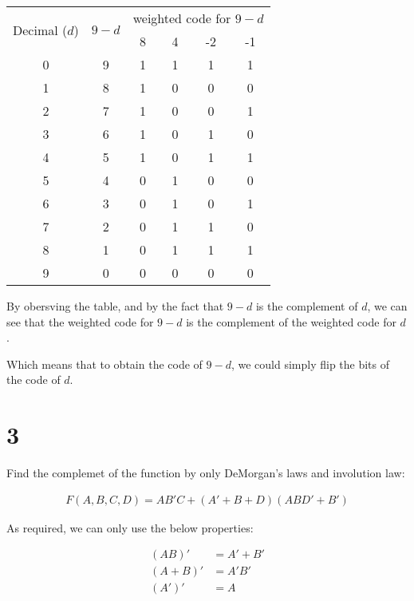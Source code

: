 \documentclass{article}
\begin{document}
\begin{center}
    \begin{tabular}{ |c|c||c|c|c|c| } 
        \hline
        \multirow{2}{*}{Decimal ($d$)} & \multirow{2}{*}{$9-d$} & \multicolumn{4}{c|}{weighted code for $9-d$} \\
        \cline{3-6}
         &  & 8 & 4 & -2 & -1 \\
        \hline
        0 & 9 & 1 & 1 & 1 & 1 \\ 
        1 & 8 & 1 & 0 & 0 & 0 \\ 
        2 & 7 & 1 & 0 & 0 & 1 \\ 
        3 & 6 & 1 & 0 & 1 & 0 \\ 
        4 & 5 & 1 & 0 & 1 & 1 \\ 
        5 & 4 & 0 & 1 & 0 & 0 \\ 
        6 & 3 & 0 & 1 & 0 & 1 \\ 
        7 & 2 & 0 & 1 & 1 & 0 \\ 
        8 & 1 & 0 & 1 & 1 & 1 \\
        9 & 0 & 0 & 0 & 0 & 0 \\
        \hline
    \end{tabular}
\end{center}

By obersving the table, and by the fact that $9-d$ is the complement of $d$,
we can see that the weighted code for $9-d$ is the complement of the weighted code for $d$.

\bigskip
Which means that to obtain the code of $9-d$, we could simply flip the bits of the code of $d$.


\newpage

\section*{3}

Find the complemet of the function by only DeMorgan's laws and involution law:

\begin{align*}
    F(A, B, C, D) = AB'C + (A' + B + D)(ABD' + B')
\end{align*}

As required, we can only use the below properties:

\begin{align*}
    (AB)' &= A' + B' \\
    (A + B)' &= A'B' \\
    (A')' &= A \\
\end{align*}
\end{document}
